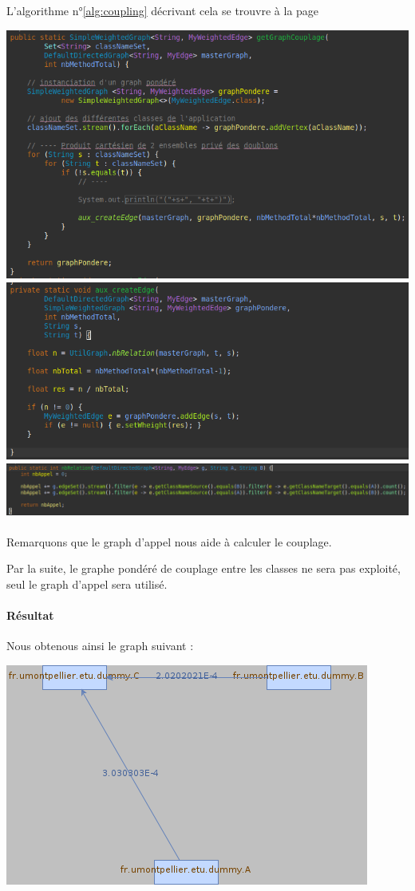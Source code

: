 \documentclass[a4paper]{article}
\begin{document}
\begin{multicols}{2}
        L'algorithme n°\ref{alg:coupling} décrivant cela se trouvre à la page \pageref{alg:coupling} 
        
        \noindent\includegraphics[width=.46\textwidth]{coupl/codeA}
        \noindent\includegraphics[width=.46\textwidth]{coupl/codeB}
        \noindent\includegraphics[width=.46\textwidth]{coupl/codeC}

        \paragraph{} Remarquons que le graph d'appel nous aide à calculer le couplage.

        Par la suite, le graphe pondéré de couplage entre les classes ne sera pas exploité, seul le graph d'appel sera utilisé.

        \paragraph{Résultat} Nous obtenous ainsi le graph suivant :

        \noindent\includegraphics[width=.46\textwidth]{coupl/graphPondereCouplageClass}

\end{multicols}
\end{document}

